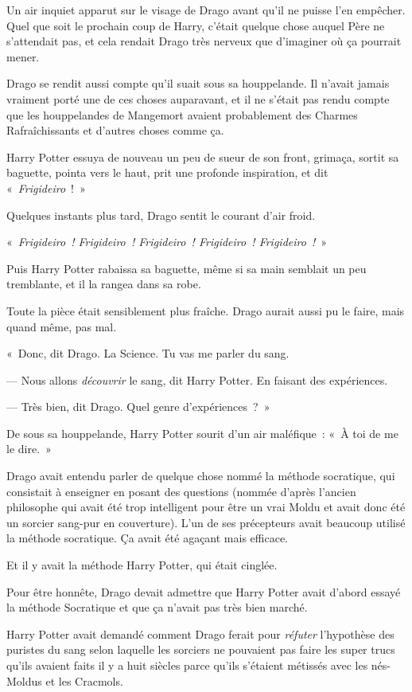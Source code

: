 Un air inquiet apparut sur le visage de Drago avant qu'il ne puisse l'en empêcher.
Quel que soit le prochain coup de Harry, c'était quelque chose auquel Père ne s'attendait pas, et cela rendait Drago très nerveux que d'imaginer où ça pourrait mener.

Drago se rendit aussi compte qu'il suait sous sa houppelande.
Il n'avait jamais vraiment porté une de ces choses auparavant, et il ne s'était pas rendu compte que les houppelandes de Mangemort avaient probablement des Charmes Rafraîchissants et d'autres choses comme ça.

Harry Potter essuya de nouveau un peu de sueur de son front, grimaça, sortit sa baguette, pointa vers le haut, prit une profonde inspiration, et dit «~\emph{Frigideiro}~!~»

Quelques instants plus tard, Drago sentit le courant d'air froid.

«~\emph{Frigideiro~!
Frigideiro~!
Frigideiro~!
Frigideiro~!
Frigideiro~!}~»

Puis Harry Potter rabaissa sa baguette, même si sa main semblait un peu tremblante, et il la rangea dans sa robe.

Toute la pièce était sensiblement plus fraîche.
Drago aurait aussi pu le faire, mais quand même, pas mal.

«~Donc, dit Drago.
La Science.
Tu vas me parler du sang.

--- Nous allons \emph{découvrir} le sang, dit Harry Potter.
En faisant des expériences.

--- Très bien, dit Drago.
Quel genre d'expériences~?~»

De sous sa houppelande, Harry Potter sourit d'un air maléfique~: «~À toi de me le dire.~»

\later

Drago avait entendu parler de quelque chose nommé la méthode socratique, qui consistait à enseigner en posant des questions (nommée d'après l'ancien philosophe qui avait été trop intelligent pour être un vrai Moldu et avait donc été un sorcier sang-pur en couverture).
L'un de ses précepteurs avait beaucoup utilisé la méthode socratique.
Ça avait été agaçant mais efficace.

Et il y avait la méthode Harry Potter, qui était cinglée.

Pour être honnête, Drago devait admettre que Harry Potter avait d'abord essayé la méthode Socratique et que ça n'avait pas très bien marché.

Harry Potter avait demandé comment Drago ferait pour \emph{réfuter} l'hypothèse des puristes du sang selon laquelle les sorciers ne pouvaient pas faire les super trucs qu'ils avaient faits il y a huit siècles parce qu'ils s'étaient métissés avec les nés-Moldus et les Cracmols.

